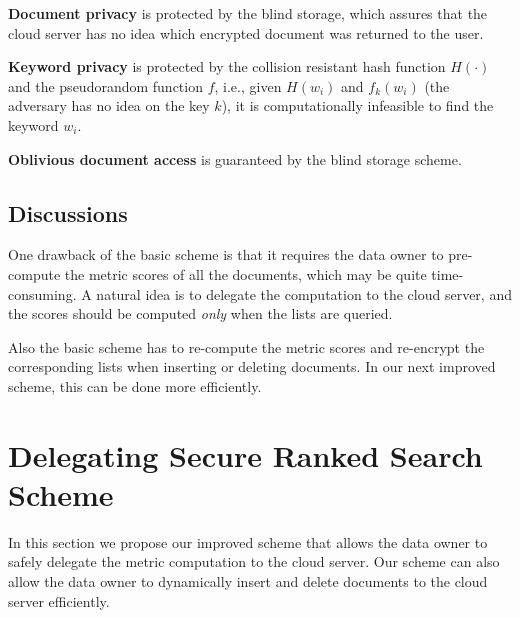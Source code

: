 \documentclass{IEEEtran}
\begin{document}
\textbf{Document privacy} is protected by the blind storage, which assures that the cloud server has no idea which encrypted document was returned to the user. 

\textbf{Keyword privacy} is protected by the collision resistant hash function $H(\cdot)$ and the pseudorandom function $f$, i.e., given $H(w_i)$ and $f_k(w_i)$ (the adversary has no idea on the key $k$), it is computationally infeasible to find the keyword $w_i$.

\textbf{Oblivious document access} is guaranteed by the blind storage scheme.

\subsection{Discussions}
One drawback of the basic scheme is that it requires the data owner to pre-compute the metric scores of all the documents, which may be quite time-consuming. A natural idea is to delegate the computation to the cloud server, and the scores should be computed \emph{only} when the lists are queried.

Also the basic scheme has to re-compute the metric scores and re-encrypt the corresponding lists when inserting or deleting documents. In our next improved scheme, this can be done more efficiently.


\section{Delegating Secure Ranked Search Scheme}
In this section we propose our improved scheme that allows the data owner to safely delegate the metric computation to the cloud server. Our scheme can also allow the data owner to dynamically insert and delete documents to the cloud server efficiently.
\end{document}
